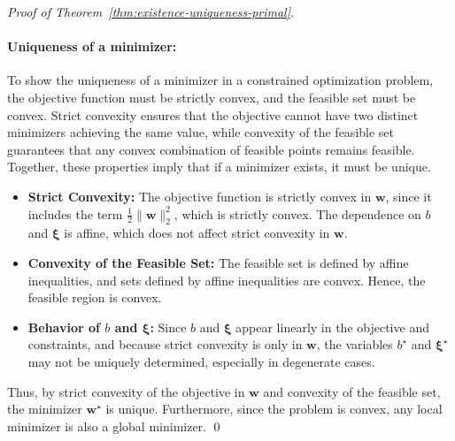 \begin{proof}[Proof of Theorem~\ref{thm:existence-uniqueness-primal}]
	\paragraph{Uniqueness of a minimizer:} To show the uniqueness of a minimizer in a constrained optimization problem, the objective function must be strictly convex, and the feasible set must be convex.
	Strict convexity ensures that the objective cannot have two distinct minimizers achieving the same
	value, while convexity of the feasible set guarantees that any convex combination of feasible points
	remains feasible. Together, these properties imply that if a minimizer exists, it must be unique.
	\begin{itemize}
		\item \textbf{Strict Convexity:} The objective function is strictly convex in $\symbf{w}$, since it
		      includes the term $\frac{1}{2}\|\symbf{w}\|_2^2$, which is strictly convex.
		      The dependence on $b$ and $\symbf{\xi}$ is affine, which does not affect strict convexity in
		      $\symbf{w}$.

		\item \textbf{Convexity of the Feasible Set:} The feasible set is defined by affine inequalities,
		      and sets defined by affine inequalities are convex. Hence, the feasible region is convex.

		\item \textbf{Behavior of $b$ and $\symbf{\xi}$:} Since $b$ and $\symbf{\xi}$ appear linearly in
		      the objective and constraints, and because strict convexity is only in $\symbf{w}$, the
		      variables $b^\star$ and $\symbf{\xi}^\star$ may not be uniquely determined, especially in
		      degenerate cases.
	\end{itemize}
	Thus, by strict convexity of the objective in $\symbf{w}$ and convexity of the feasible set, the
	minimizer $\symbf{w}^\star$ is unique. Furthermore, since the problem is convex, any local minimizer
	is also a global minimizer. \qed
\end{proof}